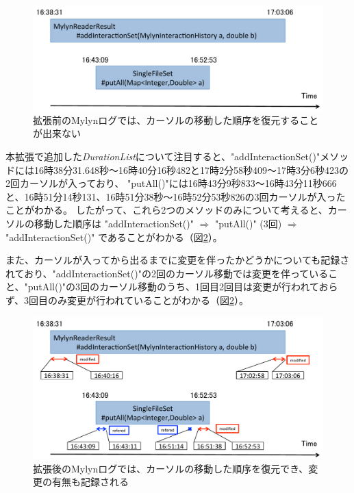 \documentclass[a4paper]{jsbook}
\def\Ra{\Rightarrow}
\begin{document}
\begin{figure}[tb]
  \centering
  \includegraphics[width = \linewidth]{resource/only_startdate_enddate.pdf}
  \caption{拡張前のMylynログでは、カーソルの移動した順序を復元することが出来ない}
  \label{only_startdate_enddate}
\end{figure}


本拡張で追加した{\it DurationList}について注目すると、"addInteractionSet()"メソッドには16時38分31.648秒〜16時40分16秒482と17時2分58秒409〜17時3分6秒423の2回カーソルが入っており、
"putAll()"には16時43分9秒833〜16時43分11秒666と、16時51分14秒131、16時51分38秒〜16時52分53秒826の3回カーソルが入ったことがわかる。
したがって、これら2つのメソッドのみについて考えると、カーソルの移動した順序は
"addInteractionSet()" $\Ra$
"putAll()" (3回) $\Ra$
"addInteractionSet()"
であることがわかる（図\ref{with_durationlist}）。

また、カーソルが入ってから出るまでに変更を伴ったかどうかについても記録されており、"addInteractionSet()"の2回のカーソル移動では変更を伴っていること、"putAll()"の3回のカーソル移動のうち、1回目2回目は変更が行われておらず、3回目のみ変更が行われていることがわかる（図\ref{with_durationlist}）。

\begin{figure}[tb]
  \centering
  \includegraphics[width = \linewidth]{resource/with_durationlist.pdf}
  \caption{拡張後のMylynログでは、カーソルの移動した順序を復元でき、変更の有無も記録される}
  \label{with_durationlist}
\end{figure}
\end{document}
